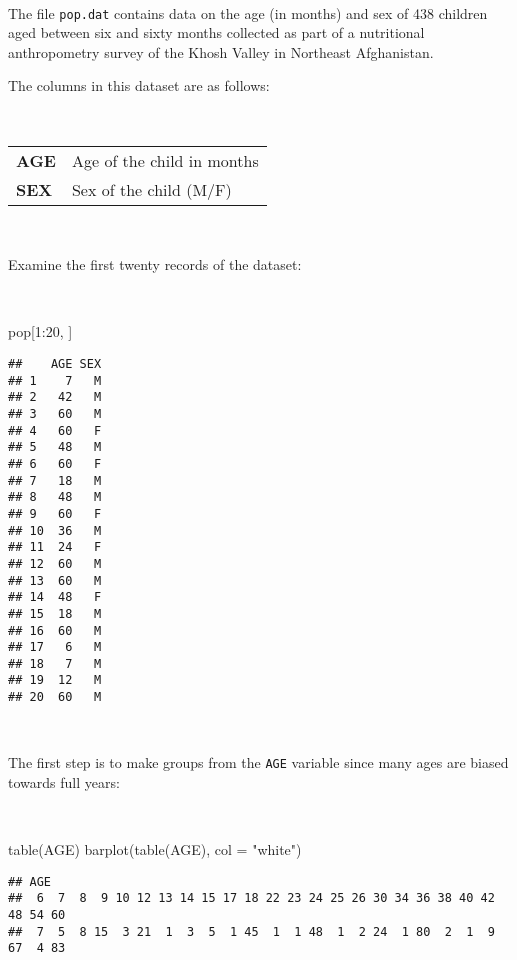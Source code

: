 \documentclass[
  12pt,
  a4paper]{book}
\newenvironment{Shaded}{\begin{snugshade}}{\end{snugshade}}
\newcommand{\AttributeTok}[1]{\textcolor[rgb]{0.77,0.63,0.00}{#1}}
\newcommand{\DecValTok}[1]{\textcolor[rgb]{0.00,0.00,0.81}{#1}}
\newcommand{\FunctionTok}[1]{\textcolor[rgb]{0.00,0.00,0.00}{#1}}
\newcommand{\NormalTok}[1]{#1}
\newcommand{\SpecialCharTok}[1]{\textcolor[rgb]{0.00,0.00,0.00}{#1}}
\newcommand{\StringTok}[1]{\textcolor[rgb]{0.31,0.60,0.02}{#1}}
\begin{document}
~

The file \texttt{pop.dat} contains data on the age (in months) and sex of 438 children aged between six and sixty months collected as part of a nutritional anthropometry survey of the Khosh Valley in Northeast Afghanistan.

The columns in this dataset are as follows:

~

\begin{longtable}[]{@{}
  >{\raggedright\arraybackslash}p{}
  >{\raggedright\arraybackslash}p{}@{}}
\toprule
\endhead
\textbf{AGE} & Age of the child in months \\
\textbf{SEX} & Sex of the child (M/F) \\
\bottomrule
\end{longtable}

~

Examine the first twenty records of the dataset:

~

\begin{Shaded}
\begin{Highlighting}[]
\NormalTok{pop[}\DecValTok{1}\SpecialCharTok{:}\DecValTok{20}\NormalTok{, ]}
\end{Highlighting}
\end{Shaded}

\begin{verbatim}
##    AGE SEX
## 1    7   M
## 2   42   M
## 3   60   M
## 4   60   F
## 5   48   M
## 6   60   F
## 7   18   M
## 8   48   M
## 9   60   F
## 10  36   M
## 11  24   F
## 12  60   M
## 13  60   M
## 14  48   F
## 15  18   M
## 16  60   M
## 17   6   M
## 18   7   M
## 19  12   M
## 20  60   M
\end{verbatim}

~

The first step is to make groups from the \texttt{AGE} variable since many ages are biased towards full years:

~

\begin{Shaded}
\begin{Highlighting}[]
\FunctionTok{table}\NormalTok{(AGE)}
\FunctionTok{barplot}\NormalTok{(}\FunctionTok{table}\NormalTok{(AGE), }\AttributeTok{col =} \StringTok{"white"}\NormalTok{)}
\end{Highlighting}
\end{Shaded}

\begin{verbatim}
## AGE
##  6  7  8  9 10 12 13 14 15 17 18 22 23 24 25 26 30 34 36 38 40 42 48 54 60 
##  7  5  8 15  3 21  1  3  5  1 45  1  1 48  1  2 24  1 80  2  1  9 67  4 83
\end{verbatim}
\end{document}
